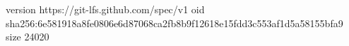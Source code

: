 version https://git-lfs.github.com/spec/v1
oid sha256:6e581918a8fe0806e6d87068ca2fb8b9f12618e15fdd3c553af1d5a58155bfa9
size 24020
